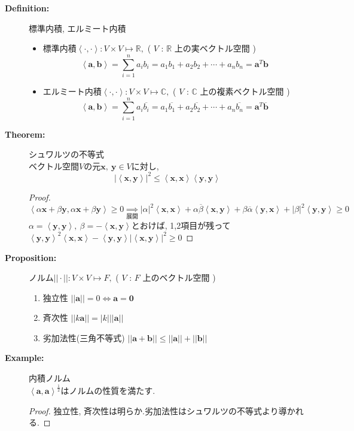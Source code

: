 \documentclass[dvipdfmx]{jsarticle}
\newcommand{\tlinner}[2]{%
    \left\langle #1, #2 \right\rangle%
}
\begin{document}
\begin{description}
    \item[\bf{Definition:}] 標準内積, エルミート内積
        \begin{itemize}
            \item 標準内積$\tlinner{\bm{\cdot}}{\bm{\cdot}} : V \times V \mapsto \mathbb{R},$ ( $V$ : $\mathbb{R}$ 上の実ベクトル空間 )
                $$ \tlinner{\bm{a}}{\bm{b}} = \sum_{i=1}^n a_ib_i = a_1b_1 + a_2b_2 + \cdots + a_nb_n = \bm{a}^T \bm{b}$$
            \item エルミート内積$\tlinner{\bm{\cdot}}{\bm{\cdot}} : V \times V \mapsto \mathbb{C},$ ( $V$ : $\mathbb{C}$ 上の複素ベクトル空間 )
            $$ \tlinner{\bm{a}}{\bm{b}} = \sum_{i=1}^n a_i \overline{b_i} = a_1\overline{b_1} + a_2\overline{b_2} + \cdots + a_n \overline{b_n} = \bm{a}^T \overline{\bm{b}}$$
        \end{itemize}

    \item[\bf{Theorem:}] シュワルツの不等式 \\
        ベクトル空間$V$の元$\bm{x},\ \bm{y} \in V$に対し, 
        $$ |\tlinner{\bm{x}}{\bm{y}}|^2 \leq \tlinner{\bm{x}}{\bm{x}} \tlinner{\bm{y}}{\bm{y}} $$
        \begin{proof}
            $ \tlinner{ \alpha \bm{x}+\beta \bm{y} }{\alpha \bm{x}+\beta \bm{y} } \geq 0 \underset{展開}{\Rightarrow} |\alpha|^2\tlinner{\bm{x}}{\bm{x}} + \alpha \overline{\beta} \tlinner{\bm{x}}{\bm{y}} + \beta \overline{\alpha} \tlinner{\bm{y}}{\bm{x}} + |\beta|^2\tlinner{\bm{y}}{\bm{y}} \geq 0$ \\
            $ \alpha = \tlinner{\bm{y}}{\bm{y}},\ \beta = -\tlinner{\bm{x}}{\bm{y}} $とおけば, 1,2項目が残って$\tlinner{\bm{y}}{\bm{y}}^2 \tlinner{\bm{x}}{\bm{x}} - \tlinner{\bm{y}}{\bm{y}} | \tlinner{\bm{x}}{\bm{y}} |^2 \geq 0$

        \end{proof}

    \item[\bf{Proposition:}] ノルム$ ||\cdot|| : V \times V \mapsto F,$ ( $V$ : $F$ 上のベクトル空間 )
        \begin{enumerate}
            \item 独立性 $|| \bm{a} || = 0 \Leftrightarrow \bm{a} = \bm{0} $
            \item 斉次性 $|| k \bm{a} || = | k | || \bm{a} ||$
            \item 劣加法性(三角不等式) $ || \bm{a} + \bm{b} || \leq || \bm{a} || + || \bm{b} || $
        \end{enumerate}
    
    \item[\bf{Example:}] 内積ノルム \\
        $\tlinner{\bm{a}}{\bm{a}}^{\frac{1}{2}}$はノルムの性質を満たす. \\
        \begin{proof}
            独立性, 斉次性は明らか.劣加法性はシュワルツの不等式より導かれる.
        \end{proof}
\end{description}
\end{document}
